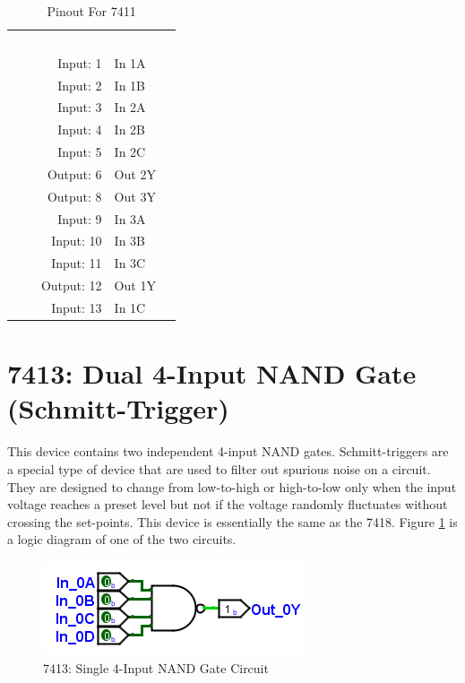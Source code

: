 \begin{table}[H]
	\sffamily
	\newcommand{\head}[1]{\textcolor{white}{\textbf{#1}}}		
	\begin{center}
		\begin{tabular}{rl} 
			\rowcolor{black!75}
			\head{Logisim Label} & \head{Function} \\
			Input: 1   & In 1A  \\
			Input: 2   & In 1B  \\
			Input: 3   & In 2A \\
			Input: 4   & In 2B  \\
			Input: 5   & In 2C  \\
			Output: 6  & Out 2Y \\
			Output: 8  & Out 3Y \\
			Input: 9   & In 3A  \\
			Input: 10  & In 3B  \\
			Input: 11  & In 3C \\
			Output: 12 & Out 1Y  \\
			Input: 13  & In 1C  \\
		\end{tabular}
	\end{center}
	\caption{Pinout For 7411}
	\label{tab:50-7411}
\end{table}

\section{7413: Dual 4-Input NAND Gate (Schmitt-Trigger)}

This device contains two independent 4-input NAND gates. Schmitt-triggers are a special type of device that are used to filter out spurious noise on a circuit. They are designed to change from low-to-high or high-to-low only when the input voltage reaches a preset level but not if the voltage randomly fluctuates without crossing the set-points. This device is essentially the same as the 7418. Figure \ref{fig:50-7413} is a logic diagram of one of the two circuits.

\begin{figure}[H]
	\centering
	\includegraphics{gfx/50-7413}
	\caption{7413: Single 4-Input NAND Gate Circuit}
	\label{fig:50-7413}
\end{figure}

